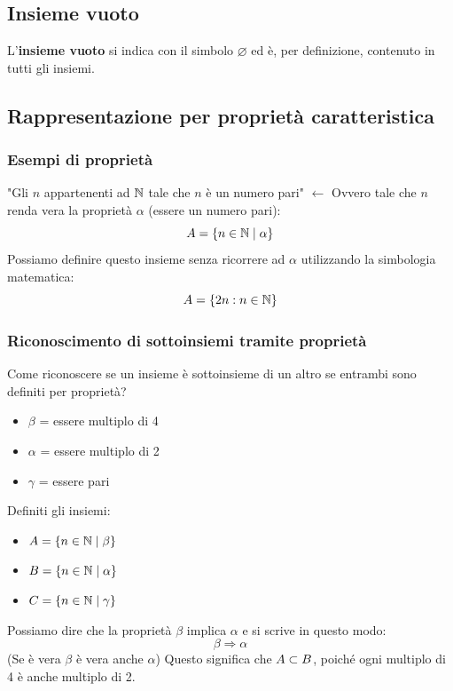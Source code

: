 \subsection{Insieme vuoto}
L'\textbf{insieme vuoto} si indica con il simbolo $\varnothing$ ed è, per definizione, contenuto in tutti gli insiemi.

\subsection{Rappresentazione per proprietà caratteristica}


\subsubsection{Esempi di proprietà}
"Gli $n$ appartenenti ad $\mathbb{N}$ tale che $n$ è un numero pari" $\leftarrow$ Ovvero tale che $n$ renda vera la proprietà $\alpha$ (essere un numero pari):
\[
A = \{n \in \mathbb{N} \mid \alpha\}
\]
Possiamo definire questo insieme senza ricorrere ad $\alpha$ utilizzando la simbologia matematica:
\[
A = \{2n : n \in \mathbb{N}\}
\]


\subsubsection{Riconoscimento di sottoinsiemi tramite proprietà}
Come riconoscere se un insieme è sottoinsieme di un altro se entrambi sono definiti per proprietà?
\begin{itemize}
    \item $\beta$ = essere multiplo di 4
    \item $\alpha$ = essere multiplo di 2
    \item $\gamma$ = essere pari
\end{itemize}

Definiti gli insiemi:
\begin{itemize}
    \item $A = \{n \in \mathbb{N} \mid \beta\}$
    \item $B = \{n \in \mathbb{N} \mid \alpha\}$
    \item $C = \{n \in \mathbb{N} \mid \gamma\}$
\end{itemize}

Possiamo dire che la proprietà $\beta$ implica $\alpha$ e si scrive in questo modo:
\[
\beta \Rightarrow \alpha
\]
(Se è vera $\beta$ è vera anche $\alpha$)
Questo significa che $A \subset B$, poiché ogni multiplo di 4 è anche multiplo di 2.

